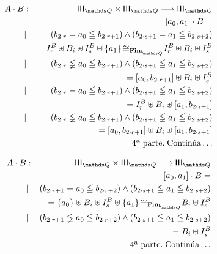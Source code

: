 \documentclass[final,12pt,a4paper,twoside,fleqn]{extbook}
\newcommand{\fromto}{\ensuremath{\longrightarrow}}
\newcommand{\set}[1]{\ensuremath{\left\lbrace{#1}\right\rbrace}}
\theoremstyle{definition}
\theoremstyle{remark}
\begin{document}
\begin{eqnarray}
A \cdot B &:& \IIIQ \times \IIIQ \fromto \IIIQ\\
&&\left[a_0,a_1\right] \cdot B =\\
&|&{ \left( b_{{2 \cdot r}} = a_0 \leqq b_{ {2 \cdot
r} + 1 } \right) } \land {\left( b_{{2\cdot s} + 1} = a_1 \leqq b_{ {2
\cdot s} + 2 } \right) } \\
\qquad&&= I_r^B \uplus B_i \uplus I_s^B \uplus \set{a_1} 
{\cong}_{\mathbf{Fin}_{\IQ}} I_r^B \uplus B_i \uplus I_s^B\\
&|&{ \left( b_{ {2 \cdot r} } \lneqq a_0 \leqq b_{ {2 \cdot
r} + 1 } \right) } \land {\left( b_{{2\cdot s} + 1} \leqq a_1 \leqq b_{ {2
\cdot s} + 2 } \right) } \\
\qquad&&= \left[a_0,b_{{2 \cdot r} + 1}\right] \uplus B_i \uplus I_s^B\\
&|&{ \left( b_{ { 2 \cdot r } } = a_0 \leqq b_{ { 2 \cdot
r } + 1 } \right) } \land {\left( b_{{2\cdot s} + 1} \lneqq a_1 \leqq b_{ {2
\cdot s} + 2 } \right) } \\
\qquad&&= I_r^B \uplus B_i \uplus \left[ {a_1,b_{ { 2 \cdot s } + 1 } }
\right] \\
&|&{ \left( b_{ {2 \cdot r} } \lneqq a_0 \leqq b_{ { 2 \cdot
r } + 1 } \right) } \land {\left( b_{{2\cdot s} + 1} \lneqq a_1 \leqq b_{ {2
\cdot s} + 2 } \right) } \\
\qquad&&= \left[ {a_0 , b_{ { 2 \cdot r } + 1 } } \right] \uplus B_i \uplus
\left[ {a_1,b_{ { 2 \cdot s } + 1 } } \right] \\ \nonumber
&&\text{4ª parte.}\;\text{Continúa}\ldots
\end{eqnarray}




\begin{eqnarray}
A \cdot B &:& \IIIQ \times \IIIQ \fromto \IIIQ\\
&&\left[a_0,a_1\right] \cdot B =\\
&|&{ \left( b_{ {2 \cdot r} + 1 } = a_0 \leqq b_{ {2 \cdot
r } + 2 } \right) } \land { \left( b_{ { 2 \cdot s } + 1 } \leqq a_1 \leqq
b_{ { 2 \cdot s } + 2 } \right) } \\
\qquad&&= \set{a_0} \uplus B_i \uplus I_s^B \uplus \set{a_1} 
{\cong}_{\mathbf{Fin}_{\IQ}} B_i \uplus I_s^B\\
&|&{ \left( b_{ { 2 \cdot r } + 1 } \lneqq a_0 \leqq b_{ {2 \cdot
r } + 2 } \right) } \land { \left( b_{ { 2 \cdot s } + 1 } \leqq a_1 \leqq
b_{ {2 \cdot s} + 2 } \right) } \\
\qquad&&= B_i \uplus I_s^B \\ \nonumber
&&\text{4ª parte.}\;\text{Continúa}\ldots
\end{eqnarray}
\end{document}
